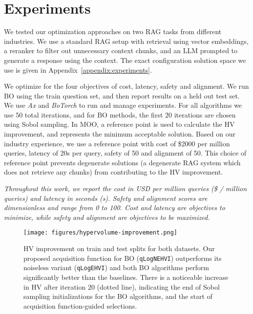 \section{Experiments}
\label{sec:experiments}

We tested our optimization approaches on two RAG tasks from different industries.  We use a standard RAG setup with retrieval using vector embeddings, a reranker to filter out unnecessary context chunks, and an LLM prompted to generate a response using the context. The exact configuration solution space we use is given in Appendix~\ref{appendix:experiments}.

We optimize for the four objectives of cost, latency, safety and alignment. We run BO using the train question set, and then report results on a held out test set. We use \emph{Ax} \citep{bakshy2018ae} and \emph{BoTorch} \citep{balandat2020botorch} to run and manage experiments. For all algorithms we use 50 total iterations, and for BO methods, the first 20 iterations are chosen using Sobol sampling. In MOO, a reference point is used to calculate the HV improvement, and represents the minimum acceptable solution. Based on our industry experience, we use a reference point with cost of \$2000 per million queries, latency of 20s per query, safety of 50 and alignment of 50. This choice of reference point prevents degenerate solutions (\eg a degenerate RAG system which does not retrieve any chunks) from contributing to the HV improvement.

\textit{Throughout this work, we report the cost in USD per million queries (\$ / million queries) and latency in seconds (s). Safety and alignment scores are dimensionless and range from 0 to 100. Cost and latency are objectives to minimize, while safety and alignment are objectives to be maximized.}

\begin{figure}[t]
    \centering
    \texttt{[image: figures/hypervolume-improvement.png]}
    \caption{HV improvement on train and test splits for both datasets. Our proposed acquisition function for BO (\texttt{qLogNEHVI}) outperforms its noiseless variant (\texttt{qLogEHVI}) and both BO algorithms perform significantly better than the baselines. There is a noticeable increase in HV after iteration 20 (dotted line), indicating the end of Sobol sampling initializations for the BO algorithms, and the start of acquisition function-guided selections.}
    \label{fig:hvi}
\end{figure}

